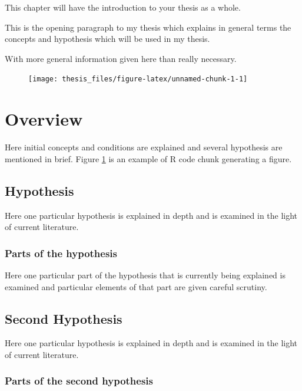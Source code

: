 \documentclass[
  12pt,
  notitlepage]{isuthesis}
\begin{document}
This chapter will have the introduction to your thesis as a whole.

This is the opening paragraph to my thesis which
explains in general terms the concepts and hypothesis
which will be used in my thesis.

With more general information given here than really
necessary.

\begin{figure}[h!tb] \centering

\begin{center}\texttt{[image: thesis\_files/figure-latex/unnamed-chunk-1-1]} \end{center}

\label{code_figure}
\end{figure}

\section{Overview}

Here initial concepts and conditions are explained and
several hypothesis are mentioned in brief. Figure \ref{code_figure} is an example of R code chunk generating a figure.

\subsection{Hypothesis}

Here one particular hypothesis is explained in depth
and is examined in the light of current literature.

\subsubsection{Parts of the hypothesis}

Here one particular part of the hypothesis that is
currently being explained is examined and particular
elements of that part are given careful scrutiny.

\subsection{Second Hypothesis}

Here one particular hypothesis is explained in depth
and is examined in the light of current literature.

\subsubsection{Parts of the second hypothesis}
\end{document}

